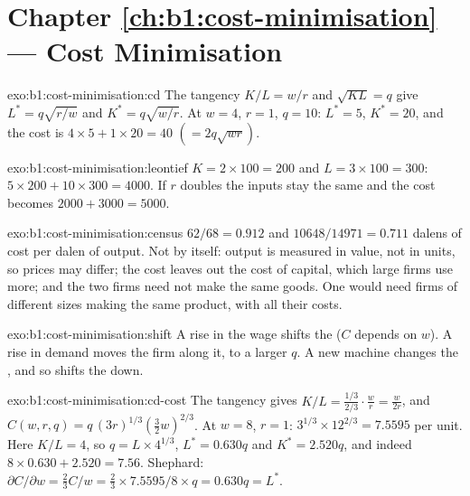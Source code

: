 \section*{Chapter \ref{ch:b1:cost-minimisation} --- Cost Minimisation}

\begin{solution}{exo:b1:cost-minimisation:cd}
The tangency $K/L = w/r$ and $\sqrt{KL} = q$ give $L^* = q\sqrt{r/w}$ and
$K^* = q\sqrt{w/r}$. At $w = 4$, $r = 1$, $q = 10$: $L^* = 5$, $K^* = 20$, and the cost is
$4 \times 5 + 1 \times 20 = 40$ $(= 2q\sqrt{wr})$.
\end{solution}

\begin{solution}{exo:b1:cost-minimisation:leontief}
$K = 2 \times 100 = 200$ and $L = 3 \times 100 = 300$: $5 \times 200 + 10 \times 300 = 4000$. If $r$
doubles the inputs stay the same and the cost becomes $2000 + 3000 = 5000$.
\end{solution}

\begin{solution}{exo:b1:cost-minimisation:census}
$62/68 = 0.912$ and $10648/14971 = 0.711$ dalens of cost per dalen of output.
Not by itself: output is measured in value, not in units, so prices may
differ; the cost leaves out the cost of capital, which large firms use
more; and the two firms need not make the same goods. One would need firms
of different sizes making the same product, with all their costs.
\end{solution}

\begin{solution}{exo:b1:cost-minimisation:shift}
A rise in the wage shifts the  ($C$ depends on $w$). A rise in
demand moves the firm along it, to a larger $q$. A new machine changes the
, and so shifts the  down.
\end{solution}

\begin{solution}{exo:b1:cost-minimisation:cd-cost}
The tangency gives $K/L = \tfrac{1/3}{2/3}\cdot\tfrac wr = \tfrac{w}{2r}$, and
$C(w, r, q) = q\,(3r)^{1/3}(\tfrac32w)^{2/3}$. At $w = 8$, $r = 1$:
$3^{1/3} \times 12^{2/3} = 7.5595$ per unit. Here $K/L = 4$, so $q = L \times 4^{1/3}$,
$L^* = 0.630q$ and $K^* = 2.520q$, and indeed $8 \times 0.630 + 2.520 = 7.56$.
Shephard: $\partial C/\partial w = \tfrac23C/w = \tfrac23 \times 7.5595/8 \times q = 0.630q = L^*$.
\end{solution}

